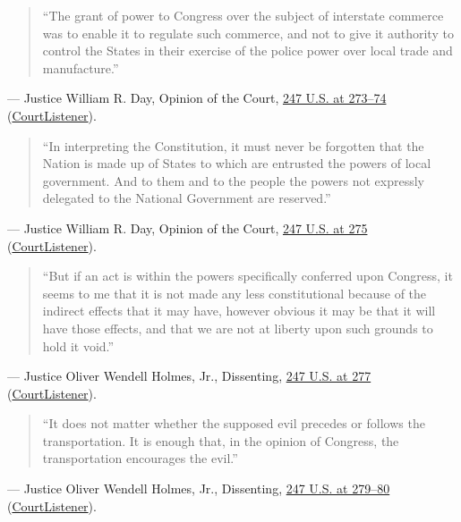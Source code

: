 \documentclass[12pt]{article}
\begin{document}
\begin{quote}
``The grant of power to Congress over the subject of interstate commerce was to enable it to regulate such commerce, and not to give it authority to control the States in their exercise of the police power over local trade and manufacture.''
\end{quote}
\noindent --- Justice William R. Day, Opinion of the Court, \href{https://supreme.justia.com/cases/federal/us/247/251/}{247 U.S. at 273--74} (\href{https://www.courtlistener.com/opinion/99190/hammer-v-dagenhart/}{CourtListener}).

\begin{quote}
``In interpreting the Constitution, it must never be forgotten that the Nation is made up of States to which are entrusted the powers of local government. And to them and to the people the powers not expressly delegated to the National Government are reserved.''
\end{quote}
\noindent --- Justice William R. Day, Opinion of the Court, \href{https://supreme.justia.com/cases/federal/us/247/251/}{247 U.S. at 275} (\href{https://www.courtlistener.com/opinion/99190/hammer-v-dagenhart/}{CourtListener}).

\begin{quote}
``But if an act is within the powers specifically conferred upon Congress, it seems to me that it is not made any less constitutional because of the indirect effects that it may have, however obvious it may be that it will have those effects, and that we are not at liberty upon such grounds to hold it void.''
\end{quote}
\noindent --- Justice Oliver Wendell Holmes, Jr., Dissenting, \href{https://supreme.justia.com/cases/federal/us/247/251/}{247 U.S. at 277} (\href{https://www.courtlistener.com/opinion/99190/hammer-v-dagenhart/}{CourtListener}).

\begin{quote}
``It does not matter whether the supposed evil precedes or follows the transportation. It is enough that, in the opinion of Congress, the transportation encourages the evil.''
\end{quote}
\noindent --- Justice Oliver Wendell Holmes, Jr., Dissenting, \href{https://supreme.justia.com/cases/federal/us/247/251/}{247 U.S. at 279--80} (\href{https://www.courtlistener.com/opinion/99190/hammer-v-dagenhart/}{CourtListener}).
\end{document}
